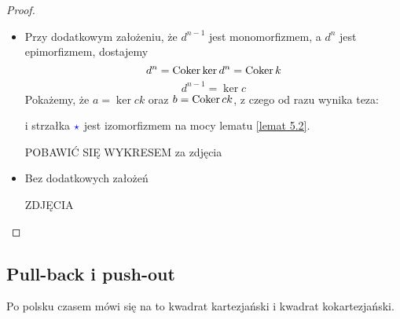 \begin{proof}
  \begin{itemize}
    \item Przy dodatkowym założeniu, że $d^{n-1}$ jest monomorfizmem, a $d^n$ jest epimorfizmem, dostajemy
  $$d^n=\operatorname{Coker}\ker d^n=\operatorname{Coker} k$$
  $$d^{n-1}=\ker c$$
  Pokażemy, że $a=\ker ck$ oraz $b=\operatorname{Coker} ck$, z czego od razu wynika teza:
  \begin{center}\end{center}
  i strzałka $\color{blue}\star$ jest izomorfizmem na mocy lematu \ref{lemat 5.2}.

  {\large\color{red}POBAWIĆ SIĘ WYKRESEM za zdjęcia}

  \begin{center}\end{center}

  \item Bez dodatkowych założeń

    {\large\color{red}ZDJĘCIA}
\end{itemize}

\end{proof}

\subsection{Pull-back i push-out}

Po polsku czasem mówi się na to kwadrat kartezjański i kwadrat kokartezjański.

